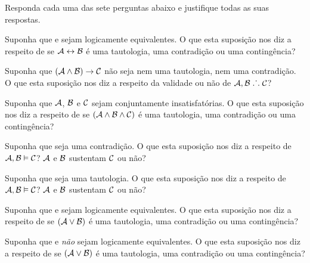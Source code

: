 \solutions
\problempart
\label{pr.TT.concepts}
Responda cada uma das sete perguntas abaixo e justifique todas as suas respostas.
\begin{earg}
\item Suponha que   e  sejam logicamente equivalentes.
O que esta suposição nos diz a respeito de se $\mathcal{A}\leftrightarrow\mathcal{B}$ é uma tautologia, uma contradição ou uma contingência?
\item Suponha que $(\mathcal{A}\wedge\mathcal{B})\rightarrow\mathcal{C}$ não seja nem uma tautologia, nem uma contradição.
O que esta suposição nos diz a respeito da validade ou não de $\mathcal{A}, \mathcal{B} \mathrel{\ldotp\dot{}\,\ldotp}\mathcal{C}$?
\item Suponha que  $\mathcal{A}$, $\mathcal{B}$ e $\mathcal{C}$ sejam conjuntamente insatisfatórias.
O que esta suposição nos diz a respeito de se $(\mathcal{A}\wedge\mathcal{B}\wedge\mathcal{C})$ é uma tautologia, uma contradição ou uma contingência?
\item Suponha que  seja uma contradição.
O que esta suposição nos diz a respeito de $\mathcal{A}, \mathcal{B} \vDash \mathcal{C}$?
$\mathcal{A}$ e $\mathcal{B}$ sustentam $\mathcal{C}$ ou não?
\item Suponha que  seja uma tautologia. 
O que esta suposição nos diz a respeito de $\mathcal{A}, \mathcal{B}\vDash \mathcal{C}$?
$\mathcal{A}$ e $\mathcal{B}$ sustentam $\mathcal{C}$ ou não?
\item Suponha que  e  sejam logicamente equivalentes.
O que esta suposição nos diz a respeito de se $(\mathcal{A}\vee\mathcal{B})$ é uma tautologia, uma contradição ou uma contingência?
\item Suponha que   e  \emph{não} sejam logicamente equivalentes.
O que esta suposição nos diz a respeito de se $(\mathcal{A}\vee\mathcal{B})$ é uma tautologia, uma contradição ou uma contingência?
\end{earg}
